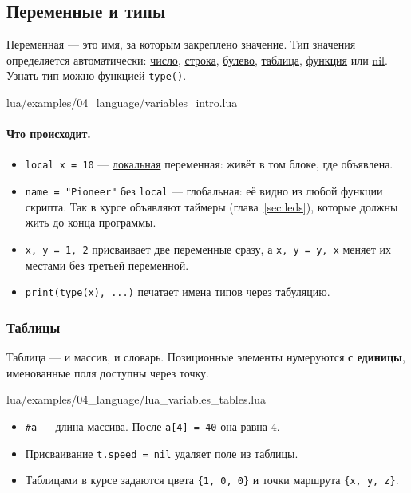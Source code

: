 \subsection{Переменные и типы}

Переменная --- это имя, за которым закреплено значение. Тип значения определяется автоматически: \hyperlink{term:number}{число}, \hyperlink{term:string}{строка}, \hyperlink{term:boolean}{булево}, \hyperlink{term:table}{таблица}, \hyperlink{term:function}{функция} или \hyperlink{term:nil}{nil}. Узнать тип можно функцией \verb|type()|.

\begin{codefile}{lua/examples/04_language/variables_intro.lua}
\end{codefile}

\paragraph{Что происходит.}
\begin{itemize}
    \item \verb|local x = 10| --- \hyperlink{term:scope}{локальная} переменная: живёт в том блоке, где объявлена.
    \item \verb|name = "Pioneer"| без \verb|local| --- глобальная: её видно из любой функции скрипта. Так в курсе объявляют таймеры (глава~\ref{sec:leds}), которые должны жить до конца программы.
    \item \verb|x, y = 1, 2| присваивает две переменные сразу, а \verb|x, y = y, x| меняет их местами без третьей переменной.
    \item \verb|print(type(x), ...)| печатает имена типов через табуляцию.
\end{itemize}

\subsubsection*{Таблицы}

Таблица --- и массив, и словарь. Позиционные элементы нумеруются \textbf{с единицы}, именованные поля доступны через точку.

\begin{codefile}{lua/examples/04_language/lua_variables_tables.lua}
\end{codefile}

\begin{itemize}
    \item \verb|#a| --- длина массива. После \verb|a[4] = 40| она равна 4.
    \item Присваивание \verb|t.speed = nil| удаляет поле из таблицы.
    \item Таблицами в курсе задаются цвета \verb|{1, 0, 0}| и точки маршрута \verb|{x, y, z}|.
\end{itemize}

